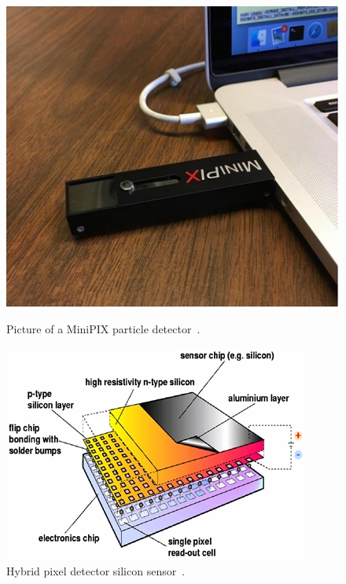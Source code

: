 \begin{figure}[H]
  \begin{minipage}[c]{0.40\linewidth}
    \includegraphics[width=\linewidth]{Figures/Minipix.png}
    \caption{Picture of a MiniPIX particle detector~\cite{advacam}.} %
    \label{fig:Minipix}
  \end{minipage}
  \hfill
  \begin{minipage}[c]{0.45\linewidth}
    \includegraphics[width=\linewidth]{Figures/MinipixLayers.png}
    \caption{Hybrid pixel detector silicon sensor~\cite{silicon_sensor}.} %
    \label{fig:MinipixLayers}
  \end{minipage}
\end{figure}

